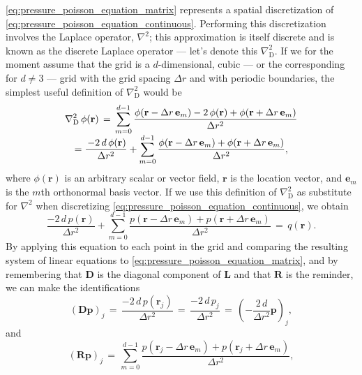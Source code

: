 \eqref{eq:pressure_poisson_equation_matrix} represents a spatial discretization of \eqref{eq:pressure_poisson_equation_continuous}. Performing this discretization involves \approximating the Laplace operator, $\nabla^2$; this approximation is itself discrete and is known as the discrete Laplace operator --- let's denote this $\nabla^2_{\text{D}}$. If we for the moment assume that the grid is a $d$-dimensional, cubic --- or the corresponding for $d \neq 3$ --- grid with the grid spacing $\Delta r$ and with periodic boundaries, the simplest useful definition of $\nabla^2_{\text{D}}$ would be
%
\begin{equation} \label{eq:grid_jacobian_simple}
\renewcommand*{\arraystretch}{2} 
\begin{array}{c}
\displaystyle \nabla^2_{\text{D}}\,\phi(\mathbf{r}) \,=\, \sum_{m=0}^{d-1} \frac{\phi(\mathbf{r}-\Delta r\,\mathbf{e}_m)-2\,\phi(\mathbf{r})+\phi(\mathbf{r}+\Delta r\,\mathbf{e}_m)}{\Delta r^2} \\
\displaystyle =\frac{\,-2\,d\,\phi(\mathbf{r})}{\Delta r^2}+\sum_{m=0}^{d-1} \frac{\phi(\mathbf{r}-\Delta r\,\mathbf{e}_m)+\phi(\mathbf{r}+\Delta r\,\mathbf{e}_m)}{\Delta r^2},
\end{array}
\end{equation}
%
where $\phi(\mathbf{r})$ is an arbitrary scalar or vector field, $\mathbf{r}$ is the location vector, and $\mathbf{e}_m$ is the $m$th orthonormal basis vector. If we use this definition of $\nabla^2_{\text{D}}$ as substitute for $\nabla^2$ when discretizing \eqref{eq:pressure_poisson_equation_continuous}, we obtain
%
\begin{equation} \label{eq:pressure_poisson_equation_discretized}
\frac{-2\,d\,p(\mathbf{r})}{\Delta r^2}+\sum_{m=0}^{d-1} \frac{p(\mathbf{r}-\Delta r\,\mathbf{e}_m)+p(\mathbf{r}+\Delta r\,\mathbf{e}_m)}{\Delta r^2} \,=\, q(\mathbf{r}).
\end{equation}
%
By applying this equation to each point in the grid and comparing the resulting system of linear equations to \eqref{eq:pressure_poisson_equation_matrix}, and by remembering that $\mathbf{D}$ is the diagonal component of $\mathbf{L}$ and that $\mathbf{R}$ is the reminder, we can make the identifications
%
\begin{equation} \label{eq:diagonal_matrix_structured_grid}
(\mathbf{D}\mathbf{p})_j \,=\, \frac{-2\,d\,p(\mathbf{r}_j)}{\Delta r^2} \,=\, \frac{-2\,d\,p_j}{\Delta r^2} \,=\, \left(-\frac{2\,d}{\Delta r^2}\mathbf{p}\right)_j,
\end{equation}
%
and
%
\begin{equation} \label{eq:reminder_matrix_structured_grid}
(\mathbf{R}\mathbf{p})_j \,=\, \sum_{m=0}^{d-1} \frac{p(\mathbf{r}_j-\Delta r\,\mathbf{e}_m)+p(\mathbf{r}_j+\Delta r\,\mathbf{e}_m)}{\Delta r^2},
\end{equation}
